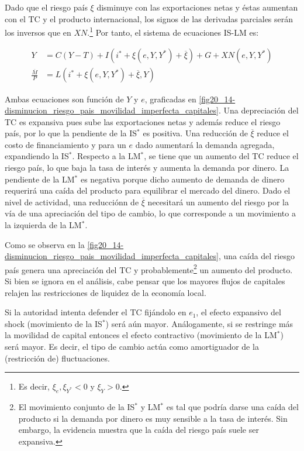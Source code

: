 \documentclass[DeGregorioResumen]{subfiles}
\begin{document}
Dado que el riesgo país $\xi$ disminuye con las exportaciones netas y éstas aumentan con el TC y el producto internacional, los signos de las derivadas parciales serán los inversos que en $XN$.\footnote{Es decir, $\xi_e, \xi_{Y^*}<0$ y $\xi_Y>0$.} Por tanto, el sistema de ecuaciones IS-LM es:

\begin{align*}
	Y &= C(Y-T) + I(i^*+\xi(e, Y, Y^*) + \overline\xi) + G + XN(e, Y, Y^*) \\
	\frac{\overline M}{P} &= L(i^* + \xi(e, Y, Y^*) + \overline\xi, Y)
\end{align*}

Ambas ecuaciones son función de $Y$ y $e$, graficadas en \autoref{fig20_14-disminucion_riesgo_pais_movilidad_imperfecta_capitales}. Una depreciación del TC es expansiva pues sube las exportaciones netas y además reduce el riesgo país, por lo que la pendiente de la IS$^*$ es positiva. Una reducción de $\overline\xi$ reduce el costo de financiamiento y para un $e$ dado aumentará la demanda agregada, expandiendo la IS$^*$. Respecto a la LM$^*$, se tiene que un aumento del TC reduce el riesgo país, lo que baja la tasa de interés y aumenta la demanda por dinero. La pendiente de la LM$^*$ es negativa porque dicho aumento de demanda de dinero requerirá una caída del producto para equilibrar el mercado del dinero. Dado el nivel de actividad, una reducciónn de $\overline\xi$ necesitará un aumento del riesgo por la vía de una apreciación del tipo de cambio, lo que corresponde a un movimiento a la izquierda de la LM$^*$. 



Como se observa en la \autoref{fig20_14-disminucion_riesgo_pais_movilidad_imperfecta_capitales}, una caída del riesgo país genera una apreciación del TC y probablemente\footnote{El movimiento conjunto de la IS$^*$ y LM$^*$ es tal que podría darse una caída del producto si la demanda por dinero es muy sensible a la tasa de interés. Sin embargo, la evidencia muestra que la caída del riesgo país suele ser expansiva.} un aumento del producto. Si bien se ignora en el análisis, cabe pensar que los mayores flujos de capitales relajen las restricciones de liquidez de la economía local.

Si la autoridad intenta defender el TC fijándolo en $e_1$, el efecto expansivo del shock (movimiento de la IS$^*$) será aún mayor. Análogamente, si se restringe más la movilidad de capital entonces el efecto contractivo (movimiento de la LM$^*$) será mayor. Es decir, el tipo de cambio actúa como amortiguador de la (restricción de) fluctuaciones.
\end{document}
